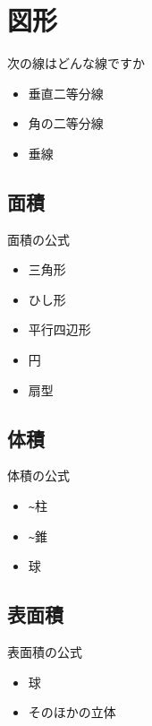 \documentclass[10pt]{jsarticle}
\begin{document}
\section{図形}
\begin{itembox}[l]{次の線はどんな線ですか}
	\begin{Large}
		\begin{itemize}
			\item 垂直二等分線
			\item 角の二等分線
			\item 垂線
		\end{itemize}
	\end{Large}
\end{itembox}


\subsection{面積}
\begin{itembox}[l]{面積の公式}
	\begin{Large}
		\begin{itemize}
			\item 三角形
			\item ひし形
			\item 平行四辺形
			\item 円
			\item 扇型
		\end{itemize}
	\end{Large}
\end{itembox}

\subsection{体積}
\begin{itembox}[l]{体積の公式}
	\begin{Large}
		\begin{itemize}
			\item  \verb|~|柱
			\item  \verb|~|錐
			\item 球
		\end{itemize}
	\end{Large}
\end{itembox}

\subsection{表面積}
\begin{itembox}[l]{表面積の公式}
	\begin{Large}
		\begin{itemize}
			\item  球
			\item そのほかの立体
		\end{itemize}
	\end{Large}
\end{itembox}
\end{document}
